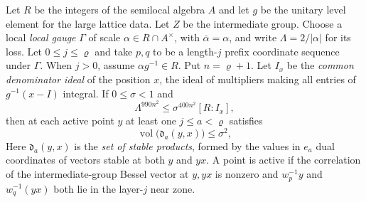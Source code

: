 \begin{lemma}
\label{lem:b-ideal-depth}
\emitthmsource
Let $R$ be the integers of the semilocal algebra $A$ and let $g$ be the unitary level element for the large lattice data.
Let $Z$ be the intermediate group. Choose a local \emph{local gauge} $\Gamma$ of scale $\alpha\in R\cap A^\times$,
with $\bar\alpha=\alpha$, and write $\Lambda=2/|\alpha|$ for its loss.
Let $0\le j\le\varrho$ and take $p,q$ to be a length-$j$ prefix coordinate sequence under $\Gamma$.
When $j>0$, assume $\alpha g^{-1}\in R$. Put $n=\varrho+1$.
Let $I_x$ be the \emph{common denominator ideal} of the position $x$, the ideal of multipliers making all entries of $g^{-1}(x-I)$ integral.
If $0\le\sigma<1$ and
\[
  \Lambda^{990n^2}\le \sigma^{400n^2}[R:I_x],
\]
then at each active point $y$ at least one $j\le a<\varrho$ satisfies
\[
  \operatorname{vol}\bigl(\mathfrak d_a(y,x)\bigr)\le \sigma^2,
\]
Here $\mathfrak d_a(y,x)$ is the \emph{set of stable products}, formed by the values in $e_a$ dual coordinates of vectors stable at both $y$ and $yx$.
A point is active if the correlation of the intermediate-group Bessel vector at $y,yx$ is nonzero and
$w_p^{-1}y$ and $w_q^{-1}(yx)$ both lie in the layer-$j$ near zone.
\end{lemma}

